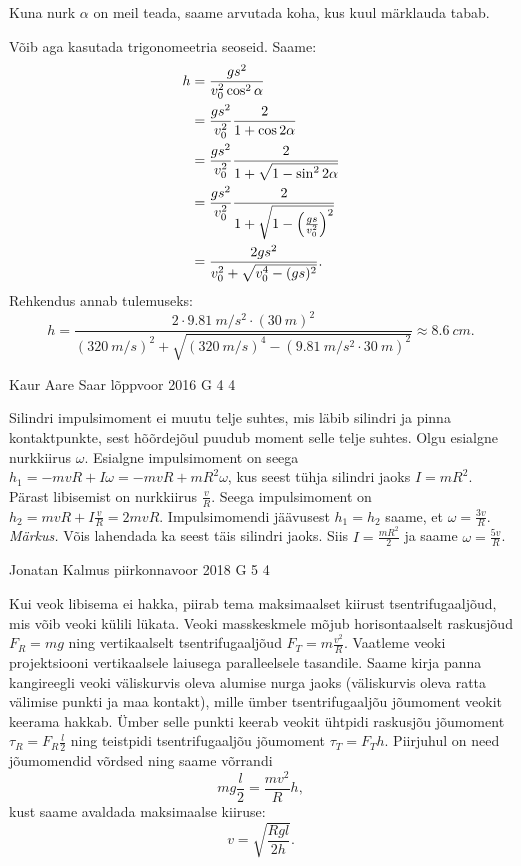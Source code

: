 \documentclass[11pt, twoside]{article}
\begin{document}
{{Kuna nurk $\alpha$ on meil teada, saame arvutada koha, kus kuul märklauda tabab.

Võib aga kasutada trigonomeetria seoseid. Saame:
\begin{align*}
h & = {gs^2 \over v_{0}^2\cos^2\alpha}\\
& = {gs^2 \over v_{0}^2}{2 \over 1+\cos2\alpha}\\
& = {gs^2 \over v_{0}^2}{2 \over 1+\sqrt{1-\sin^2 2\alpha}}\\
& = {gs^2 \over v_{0}^2}{2 \over 1+\sqrt{1-\Big({gs \over v_0^2}\Big)^2}}\\
& = {2gs^2 \over v_0^2+\sqrt{v_0^4-(gs)^2}}.
\end{align*}
Rehkendus annab tulemuseks:
$$
h  = \frac{2\cdot \SI{9,81}{m/s^2} \cdot (\SI{30}{m})^2}{(\SI{320}{m/s})^2+\sqrt{(\SI{320}{m/s})^4-(\SI{9,81}{m/s^2} \cdot \SI{30}{m})^2}} \approx \SI{8,6}{cm}.
$$
\fi
}

{Kaur Aare Saar} %
{lõppvoor} %
{2016} %
{G 4} %
{4} %
{

\ifSolution
Silindri impulsimoment ei muutu telje suhtes, mis läbib silindri ja pinna kontaktpunkte, sest hõõrdejõul puudub moment selle telje suhtes. Olgu esialgne nurkkiirus $\omega$. Esialgne impulsimoment on seega $h_1=-mvR+I\omega=-mvR+mR^2\omega$, kus seest tühja silindri jaoks $I=mR^2$. Pärast libisemist on nurkkiirus $\frac{v}{R}$. Seega impulsimoment on $h_2=mvR+I\frac{v}{R}=2mvR$.
Impulsimomendi jäävusest $h_1=h_2$ saame, et $\omega=\frac{3v}{R}$.\\
\emph{Märkus.} Võis lahendada ka seest täis silindri jaoks. Siis $I=\frac{mR^2}{2}$ ja saame $\omega = \frac{5v}{R}$.
\fi
}

{Jonatan Kalmus} %
{piirkonnavoor} %
{2018} %
{G 5} %
{4} %
{

\ifSolution
Kui veok libisema ei hakka, piirab tema maksimaalset kiirust tsentrifugaaljõud, mis võib veoki külili lükata. Veoki masskeskmele mõjub horisontaalselt raskusjõud $F_R=mg$ ning vertikaalselt tsentrifugaaljõud $F_T=m\frac{v^2}{R}$. 
Vaatleme veoki projektsiooni vertikaalsele laiusega paralleelsele tasandile. Saame kirja panna kangireegli veoki väliskurvis oleva alumise nurga jaoks (väliskurvis oleva ratta välimise punkti ja maa kontakt), mille ümber tsentrifugaaljõu jõumoment veokit keerama hakkab. Ümber selle punkti keerab veokit ühtpidi raskusjõu jõumoment $\tau_R=F_R\frac{l}{2}$ ning teistpidi tsentrifugaaljõu jõumoment $\tau_T=F_T h$. Piirjuhul on need jõumomendid võrdsed ning saame võrrandi
$$mg\frac{l}{2}=\frac{mv^2}{R}h,$$ 
kust saame avaldada maksimaalse kiiruse:
$$v=\sqrt{\frac{Rgl}{2h}}.$$ 
\fi
}

}
\end{document}
